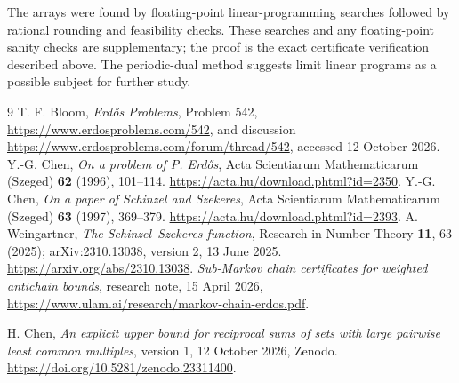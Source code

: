 \documentclass[10pt]{article}
\theoremstyle{remark}
\begin{document}
The arrays were found by floating-point linear-programming searches
followed by rational rounding and feasibility checks. These searches
and any floating-point sanity checks are supplementary; the proof is
the exact certificate verification described above. The periodic-dual
method suggests limit linear programs as a possible subject for
further study.

\begin{thebibliography}{9}
T. F. Bloom, \emph{Erd\H{o}s Problems}, Problem 542,
\url{https://www.erdosproblems.com/542}, and discussion
\url{https://www.erdosproblems.com/forum/thread/542},
accessed 12 October 2026.
Y.-G. Chen, \emph{On a problem of P. Erd\H{o}s},
Acta Scientiarum Mathematicarum (Szeged) \textbf{62} (1996), 101--114.
\url{https://acta.hu/download.phtml?id=2350}.
Y.-G. Chen, \emph{On a paper of Schinzel and Szekeres},
Acta Scientiarum Mathematicarum (Szeged) \textbf{63} (1997), 369--379.
\url{https://acta.hu/download.phtml?id=2393}.
A. Weingartner, \emph{The Schinzel--Szekeres function},
Research in Number Theory \textbf{11}, 63 (2025);
arXiv:2310.13038, version 2, 13 June 2025.
\url{https://arxiv.org/abs/2310.13038}.
\emph{Sub-Markov chain certificates for weighted antichain bounds},
research note, 15 April 2026,
\url{https://www.ulam.ai/research/markov-chain-erdos.pdf}.

H. Chen, \emph{An explicit upper bound for reciprocal sums of sets
with large pairwise least common multiples}, version 1,
12 October 2026, Zenodo.
\url{https://doi.org/10.5281/zenodo.23311400}.
\end{thebibliography}
\end{document}
